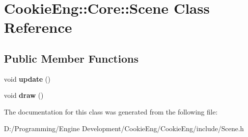 \hypertarget{class_cookie_eng_1_1_core_1_1_scene}{}\section{Cookie\+Eng\+:\+:Core\+:\+:Scene Class Reference}
\label{class_cookie_eng_1_1_core_1_1_scene}
\subsection*{Public Member Functions}
\begin{DoxyCompactItemize}
\item 
\mbox{\label{class_cookie_eng_1_1_core_1_1_scene_a4c345518d9002d5260c0f5a178f6173c}} 
void {\bfseries update} ()
\item 
\mbox{\label{class_cookie_eng_1_1_core_1_1_scene_a3da501da0ae419fec41ff52781247087}} 
void {\bfseries draw} ()
\end{DoxyCompactItemize}


The documentation for this class was generated from the following file\+:\begin{DoxyCompactItemize}
\item 
D\+:/\+Programming/\+Engine Development/\+Cookie\+Eng/\+Cookie\+Eng/include/Scene.\+h\end{DoxyCompactItemize}
